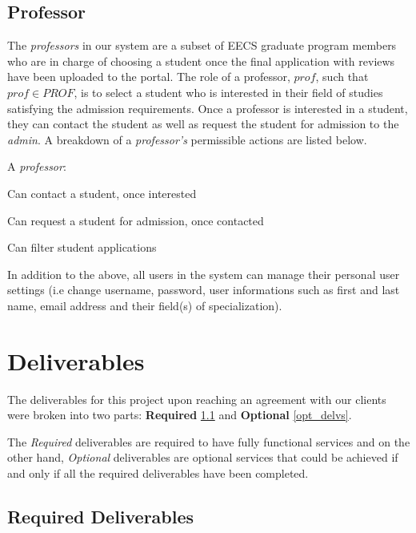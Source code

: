 \documentclass[fontsize=12pt,paper=letter,twoside]{scrartcl}
\begin{document}
\subsection{Professor}

The \emph{professors} in our system are a subset of EECS graduate program members who are in charge of choosing a student once the final application with reviews have been uploaded to the portal. The role of a professor, $prof$, such that $prof \in PROF$, is to select a student who is interested in their field of studies satisfying the admission requirements. Once a professor is interested in a student, they can contact the student as well as request the student for admission to the \emph{admin}. A breakdown of a \emph{professor's} permissible actions are listed below.

\smallskip
\noindent A \emph{professor}:

\begin{mylist}
\item Can contact a student, once interested
\item Can request a student for admission, once	contacted
\item Can filter student applications
\end{mylist}

\bigskip
\noindent In addition to the above, all users in the system can manage their personal user settings (i.e change username, password, user informations such as first and last name, email address and their field(s) of specialization).

\newpage
\section{Deliverables}

The deliverables for this project upon reaching an agreement with our clients were broken into two parts: \textbf{Required} \ref{req_delvs} and \textbf{Optional} \ref{opt_delvs}.

\smallskip

\noindent The \emph{Required} deliverables are required to have fully functional services and on the other hand, \emph{Optional} deliverables are optional services that could be achieved if and only if all the required deliverables have been completed.

\subsection{Required Deliverables} \label{req_delvs}
\end{document}

